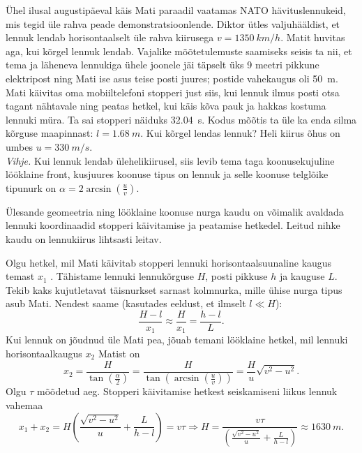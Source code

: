
Ühel ilusal augustipäeval käis Mati paraadil vaatamas NATO hävituslennukeid, mis
tegid üle rahva peade demonstratsioonlende. Diktor ütles valjuhääldist, et lennuk
lendab horisontaalselt üle rahva kiirusega $v=\SI{1350}{km/h}$. Matit huvitas aga, kui
kõrgel lennuk lendab. Vajalike mõõtetulemuste saamiseks seisis ta nii, et tema
ja läheneva lennukiga ühele joonele jäi täpselt üks 9 meetri pikkune elektripost
ning Mati ise asus teise posti juures; postide vahekaugus oli \SI{50}{m}. Mati käivitas oma
mobiiltelefoni stopperi just siis, kui lennuk ilmus posti otsa tagant nähtavale ning 
peatas hetkel, kui käis kõva pauk ja hakkas kostuma lennuki müra. Ta sai
stopperi näiduks \SI{32,04}{s}. Kodus
mõõtis ta üle ka enda silma kõrguse maapinnast: $l=\SI{1,68}{m}$.
Kui kõrgel lendas lennuk? Heli kiirus õhus on umbes
$u=\SI{330}{m/s}$.\\ 
\textit{Vihje.} Kui lennuk lendab
ülehelikiirusel, siis levib tema taga
koonusekujuline lööklaine front, kusjuures koonuse tipus on lennuk ja selle
koonuse telglõike
tipunurk on $\alpha=2\arcsin\left(\frac{u}{v}\right)$.

\hint
Ülesande geomeetria ning lööklaine koonuse nurga kaudu on võimalik avaldada lennuki koordinaadid stopperi käivitamise ja peatamise hetkedel. Leitud nihke kaudu on lennukiirus lihtsasti leitav.

\solu
Olgu hetkel, mil Mati käivitab stopperi lennuki horisontaalsuunaline kaugus
temast $x_{1}$ . Tähistame lennuki lennukõrguse $H$, posti pikkuse $h$ ja
kauguse
$L$. Tekib kaks kujutletavat täisnurkset sarnast kolmnurka, mille ühise nurga
tipus asub Mati. Nendest saame (kasutades eeldust, et ilmselt $l\ll H$):
\[\frac{H-l}{x_{1}}\approx\frac{H}{x_{1}}=\frac{h-l}{L}. \]
Kui lennuk on jõudnud üle Mati pea, jõuab temani lööklaine hetkel, mil lennuki horisontaalkaugus $x_{2}$ Matist on
\[ x_{2}=\frac{H}{\tan\left(\frac{\alpha}{2}\right)}=\frac{H}{\tan\left(\arcsin\left(\frac{u}{v}\right)\right)}=\frac{H}{u}\sqrt{v^2-u^2}.
\]
Olgu $\tau$ mõõdetud aeg. Stopperi käivitamise hetkest seiskamiseni liikus lennuk vahemaa
\[ x_1+x_2=H\left(\frac{\sqrt{v^2-u^2}}{u} +\frac{L}{h-l}\right)=v\tau
\Rightarrow
H=\frac{v\tau}{\left(\frac{\sqrt{v^2-u^2}}{u} +\frac{L}{h-l}\right)}\approx
\SI{1630}{m}.
\]
\probend